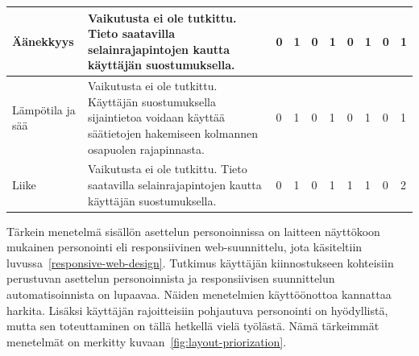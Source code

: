 \documentclass[finnish, 12pt, a4paper, elec, utf8, a-1b, online]{aaltothesis}
\begin{document}
{\begin{longtable}{p{2.5cm}|p{6cm}|p{0.5cm}p{0.5cm}p{0.5cm}|p{0.5cm}|p{0.5cm}p{0.5cm}p{0.5cm}|p{0.5cm}|}
    \midrule
    Äänekkyys                               & Vaikutusta ei ole tutkittu. Tieto saatavilla selainrajapintojen kautta käyttäjän suostumuksella.                                                                                                                                                                                                                                                                        & 0                                          & 1                                   & 0                                      & 1                            & 0                                               & 1                                         & 0                                         & 1                            \\
    \midrule
    Lämpötila ja sää                        & Vaikutusta ei ole tutkittu. Käyttäjän suostumuksella sijaintietoa voidaan käyttää säätietojen hakemiseen kolmannen osapuolen rajapinnasta.                                                                                                                                                                                                                              & 0                                          & 1                                   & 0                                      & 1                            & 0                                               & 1                                         & 0                                         & 1                            \\
    \midrule
    Liike                                   & Vaikutusta ei ole tutkittu. Tieto saatavilla selainrajapintojen kautta käyttäjän suostumuksella.                                                                                                                                                                                                                                                                        & 0                                          & 1                                   & 0                                      & 1                            & 1                                               & 1                                         & 0                                         & 2                            \\
\end{longtable}
}

Tärkein menetelmä sisällön asettelun personoinnissa on laitteen näyttökoon
mukainen personointi eli responsiivinen web-suunnittelu, jota käsiteltiin
luvussa~\ref{responsive-web-design}. Tutkimus käyttäjän kiinnostukseen
kohteisiin perustuvan asettelun personoinnista ja responsiivisen suunnittelun
automatisoinnista on lupaavaa. Näiden menetelmien käyttöönottoa kannattaa
harkita. Lisäksi käyttäjän rajoitteisiin pohjautuva personointi on hyödyllistä,
mutta sen toteuttaminen on tällä hetkellä vielä työlästä. Nämä tärkeimmät
menetelmät on merkitty kuvaan~\ref{fig:layout-priorization}.
\end{document}
